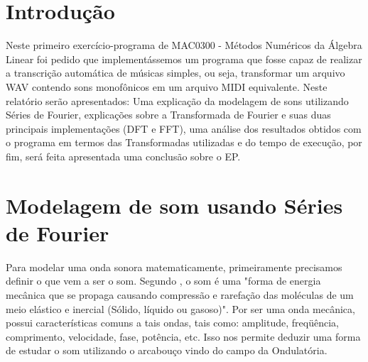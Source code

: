 \documentclass[brazil,times]{abnt}
\begin{document}





\data{\today}

\capa

\folhaderosto


\section*{Introdução\label{cap:introducao}}
	Neste primeiro exercício-programa de MAC0300 - Métodos Numéricos da Álgebra Linear foi pedido que implementássemos um programa que fosse capaz de realizar a transcrição automática de músicas simples, ou seja, transformar um arquivo WAV contendo sons monofônicos em um arquivo MIDI equivalente. Neste relatório serão apresentados: Uma explicação da modelagem de sons utilizando Séries de Fourier, explicações sobre a Transformada de Fourier e suas duas principais implementações (DFT e FFT), uma análise dos resultados obtidos com o programa em termos das Transformadas utilizadas e do tempo de execução, por fim, será feita apresentada uma conclusão sobre o EP.

\section*{Modelagem de som usando Séries de Fourier}
	Para modelar uma onda sonora matematicamente, primeiramente precisamos definir o que vem a ser o som. Segundo \cite{ufpe:computacao-musical}, o som é uma "forma de energia mecânica que se propaga causando compressão e rarefação das moléculas de um meio elástico e inercial (Sólido, líquido ou gasoso)". Por ser uma onda mecânica, possui características comuns a tais ondas, tais como: amplitude, freqüência, comprimento, velocidade, fase, potência, etc. Isso nos permite deduzir uma forma de estudar o som utilizando o arcabouço vindo do campo da Ondulatória.
	
\end{document}

